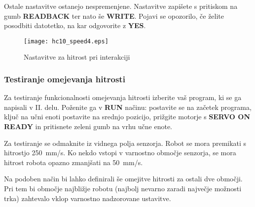 Ostale nastavitve ostanejo nespremenjene. Nastavitve zapišete s pritiskom na gumb \textbf{READBACK} ter nato še \textbf{WRITE}. Pojavi se opozorilo, če želite posodbiti datotetko, na kar odgovorite z \textbf{YES}.

\begin{figure}[!hbt]
	\centering
	\texttt{[image: hc10\_speed4.eps]}
	\caption{Nastavitve za hitrost pri interakciji}
	\label{fig:hc10_speed4}
\end{figure}

\subsubsection*{Testiranje omejevanja hitrosti}

Za testiranje funkcionalnosti omejevanja hitrosti izberite vaš program, ki se ga napisali v II. delu. Poženite ga v \textbf{RUN} načinu: postavite se na začetek programa, ključ na učni enoti postavite na srednjo pozicijo, prižgite motorje s \textbf{SERVO ON READY} in pritisnete zeleni gumb na vrhu učne enote.

Za testiranje se odmaknite iz vidnega polja senzorja. Robot se mora premikati s hitrostjo 250~mm/s. Ko nekdo vstopi v varnostno območje senzorja, se mora hitrost robota opazno zmanjšati na 50~mm/s.

Na podoben način bi lahko definirali še omejitve hitrosti za ostali dve območji. Pri tem bi območje najbližje robotu (najbolj nevarno zaradi največje možnosti trka) zahtevalo vklop varnostno nadzorovane ustavitve.




